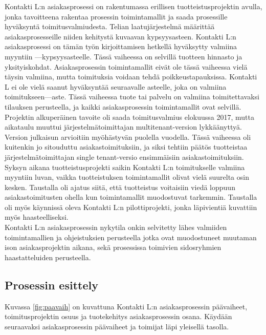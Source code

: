 \documentclass[finnish,12pt,a4paper,pdftex]{article}
\begin{document}
Kontakti L:n asiakasprosessi on rakentumassa erillisen tuotteistusprojektin avulla, jonka tavoitteena rakentaa prosessin toimintamallit ja saada prosessille hyväksyntä toimitusvalmiudesta. Telian laatujärjestelmä määrittää asiakasprosesseille niiden kehitystä kuvaavan kypsyysasteen. Kontakti L:n asiakasprosessi on tämän työn kirjoittamisen hetkellä hyväksytty valmiina myyntiin —kypsyysasteelle. Tässä vaiheessa on selvillä tuotteen hinnasto ja yksityiskohdat. Asiakasprosessin toimintamallit eivät ole tässä vaiheessa vielä täysin valmiina, mutta toimituksia voidaan tehdä poikkeustapauksissa. Kontakti L ei ole vielä saanut hyväksyntää seuraavalle asteelle, joka on valmiina toimitukseen—aste. Tässä vaiheessa tuote tai palvelu on valmiina toimitettavaksi tilauksen perusteella, ja kaikki asiakasprosessin toimintamallit ovat selvillä.\\

 Projektin alkuperäinen tavoite oli saada toimitusvalmius elokuussa 2017, mutta aikataulu muuttui järjestelmätoimittajan multitenant-version lykkäänyttyä. Version julkaisun arvioitiin myöhästyvän puolella vuodella. Tässä vaiheessa oli kuitenkin jo sitouduttu asiakastoimituksiin, ja siksi tehtiin päätös tuotteistaa järjestelmätoimittajan single tenant-versio ensimmäisiin asiakastoimituksiin. Syksyn aikana tuotteistusprojekti saikin Kontakti L:n toimitukselle valmiina myyntiin luvan, vaikka tuotteistuksen toimintamallit olivat vielä suurelta osin kesken. Taustalla oli ajatus siitä, että tuotteistus voitaisiin viedä loppuun asiakastoimitusten ohella kun toimintamallit muodostuvat tarkemmin. Taustalla oli myös käynnissä oleva Kontakti L:n pilottiprojekti, jonka läpivientiä kuvattiin myös haasteelliseksi.\\

Kontakti L:n asiakasprosessin nykytila onkin selvitetty lähes valmiiden toimintamallien ja ohjeistuksien perusteella jotka ovat muodostuneet muutaman ison asiakasprojektin aikana, sekä prosessissa toimivien sidosryhmien haastatteluiden perusteella.

\subsection{Prosessin esittely}

Kuvassa \ref{fig:paavaih} on kuvattuna Kontakti L:n asiakasprosessin päävaiheet, toimitusprojektin osuus ja tuotekehitys asiakasprosessin osana. Käydään seuraavaksi asiakasprosessin päävaiheet ja toimijat läpi yleisellä tasolla.\\
\end{document}
